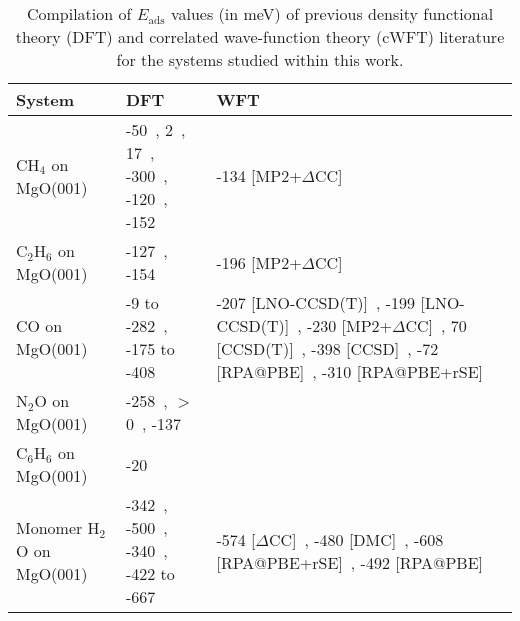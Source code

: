 \begin{table}

\caption{\label{tab:comp_lit}Compilation of $E_\textrm{ads}$ values (in meV) of previous density functional theory (DFT) and correlated wave-function theory (cWFT) literature for the systems studied within this work.}
\begin{adjustbox}{center,max width=0.85\textwidth}
\begin{tabular}{lp{7cm}p{7cm}}
\toprule
System & DFT & WFT \\ 
\midrule
CH$_4$ on MgO(001) & -50~\cite{trevethanBuildingBlocksMolecular2007}, 2~\cite{todnemMolecularAdsorptionMethane1999a}, 17~\cite{ferrariFTIRSpectroscopicDensity1998}, -300~\cite{manaeActivationCO2CH42022}, -120~\cite{mazheikaNiSubstitutionalDefects2016a}, -152~\cite{picciniEffectAnharmonicityAdsorption2014} & -134 [MP2+$\Delta$CC]~\cite{boeseAccurateAdsorptionEnergies2016} \\
C$_2$H$_6$ on MgO(001) & -127~\cite{boeseAccurateAdsorptionEnergies2016}, -154~\cite{boeseAccurateAdsorptionEnergies2016} & -196 [MP2+$\Delta$CC]~\cite{boeseAccurateAdsorptionEnergies2016} \\
CO on MgO(001) & -9 to -282~\cite{valeroGoodPerformanceM062008e}, -175 to -408~\cite{r.rehakIncludingDispersionDensity2020} & -207 [LNO-CCSD(T)]~\cite{yeAdsorptionVibrationalSpectroscopy2024a}, -199 [LNO-CCSD(T)]~\cite{shiManyBodyMethodsSurface2023a}, -230 [MP2+$\Delta$CC]~\cite{alessioChemicallyAccurateAdsorption2018}, 70 [CCSD(T)]~\cite{mazheikaNiSubstitutionalDefects2016}, -398 [CCSD]~\cite{mitraPeriodicDensityMatrix2022a}, -72 [RPA@PBE]~\cite{bajdichSurfaceEnergeticsAlkalineearth2015b}, -310 [RPA@PBE+rSE]~\cite{bajdichSurfaceEnergeticsAlkalineearth2015b} \\
N$_2$O on MgO(001) & -258~\cite{huesgesDispersionCorrectedDFT2014}, $>$0~\cite{scagnelliCatalyticDissociationN2O2006}, -137~\cite{huesgesDispersionCorrectedDFT2014} &  \\
C$_6$H$_6$ on MgO(001) & -20~\cite{trevethanBuildingBlocksMolecular2007} &  \\
Monomer H$_2$O on MgO(001) & -342~\cite{giordanoPartialDissociationWater1998a}, -500~\cite{carrascoDynamicIonPairs2008}, -340~\cite{huTrendsWaterMonomer2011}, -422 to -667~\cite{kebedeComparingVanWaals2017} & -574 [$\Delta$CC]~\cite{alessioChemicallyAccurateAdsorption2018}, -480 [DMC]~\cite{karaltiAdsorptionWaterMolecule2012}, -608 [RPA@PBE+rSE]~\cite{bajdichSurfaceEnergeticsAlkalineearth2015b}, -492 [RPA@PBE]~\cite{bajdichSurfaceEnergeticsAlkalineearth2015b} \\

\end{tabular}
\end{adjustbox}
\end{table}
